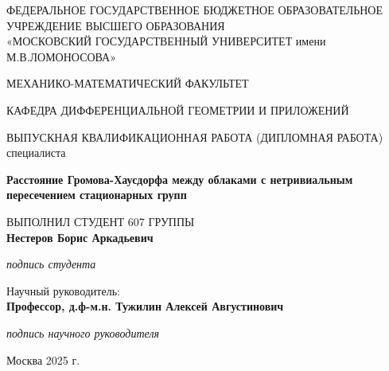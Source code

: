 
\begin{center}
  \small
  ФЕДЕРАЛЬНОЕ ГОСУДАРСТВЕННОЕ БЮДЖЕТНОЕ ОБРАЗОВАТЕЛЬНОЕ УЧРЕЖДЕНИЕ
  ВЫСШЕГО ОБРАЗОВАНИЯ\\
  «МОСКОВСКИЙ ГОСУДАРСТВЕННЫЙ УНИВЕРСИТЕТ имени М.В.ЛОМОНОСОВА»

  \vspace{1.5cm}

  МЕХАНИКО-МАТЕМАТИЧЕСКИЙ ФАКУЛЬТЕТ

  \vspace{0.5cm}

  КАФЕДРА ДИФФЕРЕНЦИАЛЬНОЙ ГЕОМЕТРИИ И ПРИЛОЖЕНИЙ

  \vspace{2cm}

  \normalsize
  ВЫПУСКНАЯ КВАЛИФИКАЦИОННАЯ РАБОТА (ДИПЛОМНАЯ РАБОТА) специалиста

  \vspace{1cm}

  \Large
  \textbf{Расстояние Громова-Хаусдорфа между облаками с нетривиальным
  пересечением стационарных групп}
\end{center}

\vspace{2cm}

\begin{flushright}
  \normalsize
  ВЫПОЛНИЛ СТУДЕНТ 607 ГРУППЫ\\
  \textbf{Нестеров Борис Аркадьевич}

  \vspace{0.5cm}
  \textit{подпись студента}

  \vspace{1cm}

  Научный руководитель:\\
  \textbf{Профессор, д.ф-м.н. Тужилин Алексей Августинович}

  \vspace{0.5cm}
  \textit{подпись научного руководителя}
\end{flushright}

\vfill

\begin{center}
  \normalsize
  Москва 2025 г.
\end{center}
